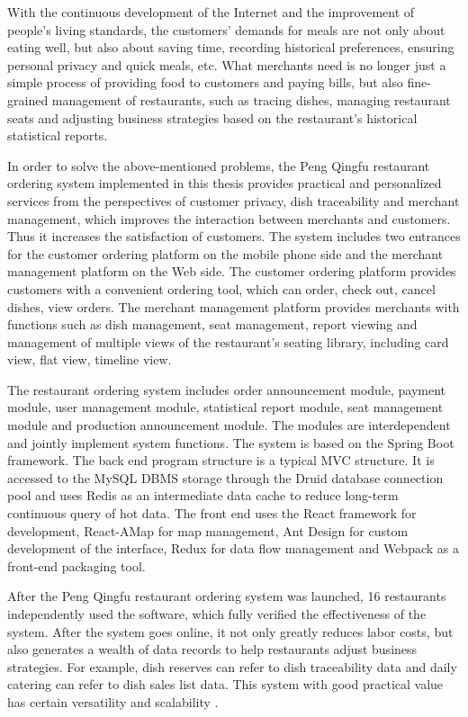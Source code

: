 \documentclass[oneside, master,review, UTF8]{NJUthesis}
\theoremstyle{plain}
\begin{document}
\begin{englishabstract}

With the continuous development of the Internet and the improvement of people's living standards, the customers' demands for meals are not only about eating well, but also about saving time, recording historical preferences, ensuring personal privacy and quick meals, etc.
What merchants need is no longer just a simple process of providing food to customers and paying bills, but also fine-grained management of restaurants, such as tracing dishes, managing restaurant seats and adjusting business strategies based on the restaurant's historical statistical reports.

In order to solve the above-mentioned problems, the Peng Qingfu restaurant ordering system implemented in this thesis 
provides practical and personalized services from the perspectives of customer privacy, dish traceability and merchant management, which improves the interaction between merchants and customers. Thus it increases the satisfaction of customers.
The system includes two entrances for the customer ordering platform on the mobile phone side and the merchant management platform on the Web side.
The customer ordering platform provides customers with a convenient ordering tool, which can order, check out, cancel dishes, view orders.
The merchant management platform provides merchants with functions such as dish  management, seat management, report viewing and management of multiple views of the restaurant's seating library, including card view, flat view, timeline view.

The restaurant ordering system includes order announcement module, payment module, user management module, statistical report module, seat management module and production announcement module. The modules are interdependent and jointly implement system functions.
The system is based on the Spring Boot framework. The back end program structure is a typical MVC structure. It is accessed to the MySQL DBMS storage through the Druid database connection pool and uses Redis as an intermediate data cache to reduce long-term continuous query of hot data.
The front end uses the React framework for development, React-AMap for map management, Ant Design for custom development of the interface, Redux for data flow management and Webpack as a front-end packaging tool.

After the Peng Qingfu restaurant ordering system was launched, 16 restaurants independently used the software, which fully verified the effectiveness of the system. 
After the system goes online, it not only greatly reduces labor costs, but also generates a wealth of data records to help restaurants adjust business strategies. 
For example, dish reserves can refer to dish traceability data and daily catering can refer to dish sales list data. This system with good practical value has certain versatility and scalability .
  

\end{englishabstract}
\end{document}
